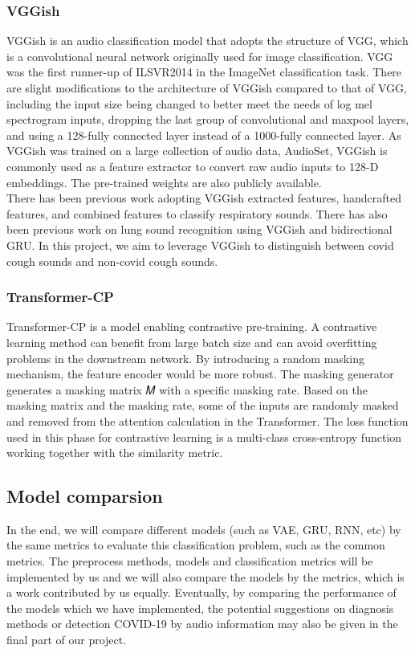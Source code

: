 \documentclass[11pt]{article}
\begin{document}
\subsubsection{VGGish}
VGGish\cite{Chao1st} is an audio classification model that adopts the structure of VGG\cite{Chao2nd}, which is a
convolutional neural network originally used for image classification. VGG was the first runner-up of
ILSVR2014 in the ImageNet classification task. There are slight modifications to the architecture of
VGGish compared to that of VGG, including the input size being changed to better meet the needs of
log mel spectrogram inputs, dropping the last group of convolutional and maxpool layers, and using
a 128-fully connected layer instead of a 1000-fully connected layer. As VGGish was trained on a large
collection of audio data, AudioSet\cite{Chao3rd}, VGGish is commonly used as a feature extractor to convert
raw audio inputs to 128-D embeddings. The pre-trained weights are also publicly available. \\

\noindent
There has been previous work adopting VGGish extracted features, handcrafted features, and combined
 features to classify respiratory sounds\cite{Chao1st}. There has also been previous work on lung sound
 recognition using VGGish and bidirectional GRU\cite{Chao5th}. In this project, we aim to leverage VGGish to
 distinguish between covid cough sounds and non-covid cough sounds.

\subsubsection{Transformer-CP}
Transformer-CP is a model enabling contrastive pre-training. A contrastive learning method can
benefit from large batch size and can avoid overfitting problems in the downstream network. By
introducing a random masking mechanism, the feature encoder would be more robust. The masking
generator generates a masking matrix 𝑀 with a specific masking rate. Based on the masking matrix
and the masking rate, some of the inputs are randomly masked and removed from the attention calculation
in the Transformer. The loss function used in this phase for contrastive learning is a multi-class
cross-entropy function working together with the similarity metric.\\


\subsection{Model comparsion}
\noindent
In the end, we will compare different models (such as VAE, GRU, RNN, etc) by the same metrics to evaluate this classification
problem, such as the common metrics\cite{hossin2015review}. The preprocess methods, models and classification metrics will be
implemented by us and we will also compare the models by the metrics, which is a work contributed by us equally.
Eventually, by comparing the performance of the models which
 we have implemented, the potential suggestions on diagnosis methods or detection COVID-19 by audio
 information may also be given in the final part of our project.



\newpage

\end{document}
